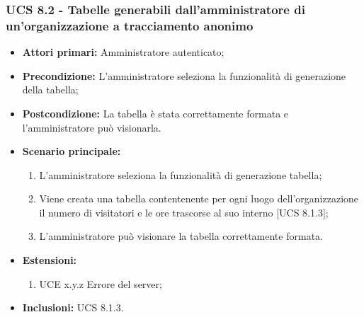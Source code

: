 \subsubsection{UCS 8.2 - Tabelle generabili dall'amministratore di un'organizzazione a tracciamento anonimo}%
\begin{itemize}
\item \textbf{Attori primari:} Amministratore autenticato;
\item \textbf{Precondizione:} L'amministratore seleziona la funzionalità di generazione della tabella;
\item \textbf{Postcondizione:} La tabella è stata correttamente formata e l'amministratore può visionarla.
\item \textbf{Scenario principale:}
	\begin{enumerate}%
	\item L'amministratore seleziona la funzionalità di generazione tabella;
	\item Viene creata una tabella contentenente per ogni luogo dell'organizzazione il numero di visitatori e le ore trascorse al suo interno [UCS 8.1.3];
	\item L'amministratore può visionare la tabella correttamente formata.
\end{enumerate}
\item \textbf{Estensioni:}
	\begin{enumerate}
		\item UCE x.y.z Errore del server;
	\end{enumerate}
\item \textbf{Inclusioni:} UCS 8.1.3.
\end{itemize}
